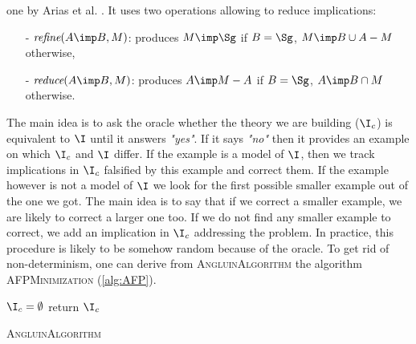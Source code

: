 one by Arias et al. \cite{arias_canonical_2009}. It uses two operations allowing to reduce implications:
\begin{itemize}
	\item[-] $\textit{refine}(A \imp B, M)$: produces $M \imp \Sg$ if $B = \Sg$, $M \imp B \cup A - M$ otherwise,
	\item[-] $\textit{reduce}(A \imp B, M)$: produces $A \imp M - A$ if $B = \Sg$, $A \imp B \cap M$ otherwise.
\end{itemize}
\noindent The main idea is to ask the oracle whether the theory we are building ($\I_c$) is equivalent to $\I$ until it answers \textit{"yes"}. If it says \textit{"no"} then it provides an example on which $\I_c$ and $\I$ differ. If
the example is a model of $\I$, then we track implications in $\I_c$ falsified
by this example and correct them. If the example however is not a model of $\I$
we look for the first possible smaller example out of the one we got. The main
idea is to say that if we correct a smaller example, we are likely to correct
a larger one too. If we do not find any smaller example to correct, we add 
an implication in $\I_c$ addressing the problem. In practice, this procedure is likely to be somehow random because of the oracle. To get rid of non-determinism, one can derive from \textsc{AngluinAlgorithm} the algorithm \textsc{AFPMinimization} (\ref{alg:AFP}).

\vspace{1.2em}

\begin{algorithm}[H]
	
	\BlankLine
	\BlankLine
	
	$\I_c = \emptyset$ \;
	return $\I_c$ \;
	
	\caption{\textsc{AngluinAlgorithm}}
	\label{alg:Angluin}
\end{algorithm}



